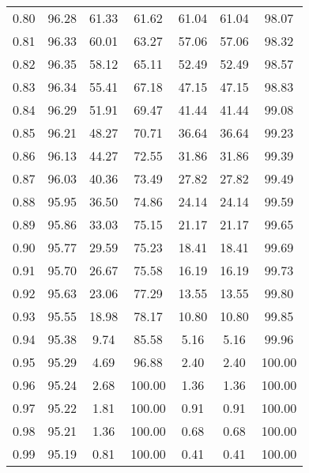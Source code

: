 \begin{tabular}{|c|c|c|c|c|c|c|}
      0.80 &     96.28 &     61.33 &      61.62 &   61.04 &      61.04 &         98.07 \\
      0.81 &     96.33 &     60.01 &      63.27 &   57.06 &      57.06 &         98.32 \\
      0.82 &     96.35 &     58.12 &      65.11 &   52.49 &      52.49 &         98.57 \\
      0.83 &     96.34 &     55.41 &      67.18 &   47.15 &      47.15 &         98.83 \\
      0.84 &     96.29 &     51.91 &      69.47 &   41.44 &      41.44 &         99.08 \\
      0.85 &     96.21 &     48.27 &      70.71 &   36.64 &      36.64 &         99.23 \\
      0.86 &     96.13 &     44.27 &      72.55 &   31.86 &      31.86 &         99.39 \\
      0.87 &     96.03 &     40.36 &      73.49 &   27.82 &      27.82 &         99.49 \\
      0.88 &     95.95 &     36.50 &      74.86 &   24.14 &      24.14 &         99.59 \\
      0.89 &     95.86 &     33.03 &      75.15 &   21.17 &      21.17 &         99.65 \\
      0.90 &     95.77 &     29.59 &      75.23 &   18.41 &      18.41 &         99.69 \\
      0.91 &     95.70 &     26.67 &      75.58 &   16.19 &      16.19 &         99.73 \\
      0.92 &     95.63 &     23.06 &      77.29 &   13.55 &      13.55 &         99.80 \\
      0.93 &     95.55 &     18.98 &      78.17 &   10.80 &      10.80 &         99.85 \\
      0.94 &     95.38 &      9.74 &      85.58 &    5.16 &       5.16 &         99.96 \\
      0.95 &     95.29 &      4.69 &      96.88 &    2.40 &       2.40 &        100.00 \\
      0.96 &     95.24 &      2.68 &     100.00 &    1.36 &       1.36 &        100.00 \\
      0.97 &     95.22 &      1.81 &     100.00 &    0.91 &       0.91 &        100.00 \\
      0.98 &     95.21 &      1.36 &     100.00 &    0.68 &       0.68 &        100.00 \\
      0.99 &     95.19 &      0.81 &     100.00 &    0.41 &       0.41 &        100.00 \\
\bottomrule
\end{tabular}
